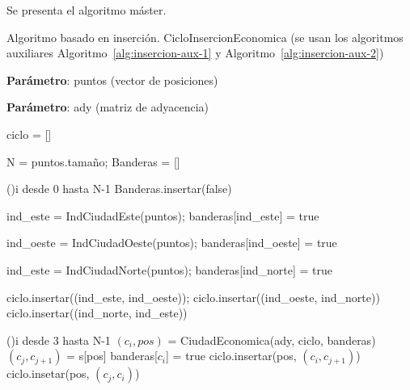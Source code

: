 Se presenta el algoritmo máster.

\begin{algorithm}[H]
    \caption{Algoritmo basado en inserción. CicloInsercionEconomica (se usan los algoritmos 
    auxiliares Algoritmo~\ref{alg:insercion-aux-1} y Algoritmo~\ref{alg:insercion-aux-2})}\label{alg:insercion}
    \begin{minipage}{0.92\textwidth}
      \textbf{Parámetro}: puntos (vector de posiciones)
      
      \textbf{Parámetro}: ady (matriz de adyacencia)
    \end{minipage}

    ciclo = []\;

    N = puntos.tamaño;
    Banderas = []\;

    \For(){i desde 0 hasta N-1}{
      Banderas.insertar(false)
    }


    ind\_este = IndCiudadEste(puntos);
    banderas[ind\_este] = true\;

    ind\_oeste = IndCiudadOeste(puntos);
    banderas[ind\_oeste] = true\;

    ind\_este = IndCiudadNorte(puntos);
    banderas[ind\_norte] = true\;


    ciclo.insertar((ind\_este, ind\_oeste));
    ciclo.insertar((ind\_oeste, ind\_norte))\;
    ciclo.insertar((ind\_norte, ind\_este))\;


    \For(){i desde 3 hasta N-1}{
      $(c_i,pos)$ = CiudadEconomica(ady, ciclo, banderas)\;
      $(c_j, c_{j+1})$ = s[pos]\;
      banderas[$c_i$] = true\;
      ciclo.insertar(pos, $(c_i,c_{j+1})$)\;
      ciclo.insetar(pos, $(c_j,c_i)$)\;
    }
\end{algorithm}

